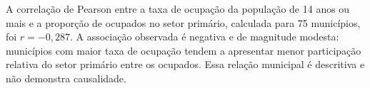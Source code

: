 A correlação de Pearson entre a taxa de ocupação da população de 14 anos ou mais e a proporção de ocupados no setor primário, calculada para 75 municípios, foi $r = -0{,}287$. A associação observada é negativa e de magnitude modesta: municípios com maior taxa de ocupação tendem a apresentar menor participação relativa do setor primário entre os ocupados. Essa relação municipal é descritiva e não demonstra causalidade.
